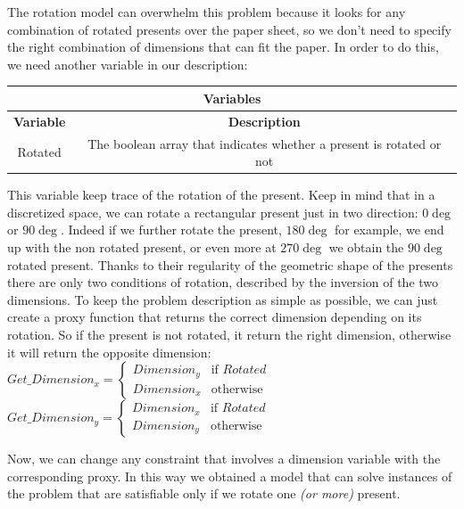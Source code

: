 The rotation model can overwhelm this problem because it looks for any combination of rotated presents over the paper sheet, so we don't need to specify the right combination
of dimensions that can fit the paper. In order to do this, we need another variable in our description:

\begin{center}
		\begin{tabular}{|c|c|}
			\hline
			\multicolumn{2}{|c|}{\textbf{Variables}} \\
			\hline
			\textbf{Variable} & {\textbf{Description}} \\
			\hline
			Rotated & The boolean array that indicates whether a present is rotated or not \\
			\hline
		\end{tabular}
\end{center}

This variable keep trace of the rotation of the present. Keep in mind that in a discretized space, we can rotate a rectangular present just in two direction: $0\deg$ or $90\deg$.
Indeed if we further rotate the present, $180\deg$ for example, we end up with the non rotated present, or even more at $270\deg$ we obtain the $90\deg$ rotated present.
Thanks to their regularity of the geometric shape of the presents there are only two conditions of rotation, described by the inversion of the two dimensions.
To keep the problem description as simple as possible, we can just create a proxy function that returns the correct dimension depending on its rotation.
So if the present is not rotated, it return the right dimension, otherwise it will return the opposite dimension:\\
$
Get\_Dimension_x = 
\begin{cases}
	Dimension_y & \text{if } Rotated \\
	Dimension_x & \text{otherwise}
\end{cases}
$
\\
$
Get\_Dimension_y = 
\begin{cases}
	Dimension_x & \text{if } Rotated \\
	Dimension_y & \text{otherwise}
\end{cases}
$

Now, we can change any constraint that involves a dimension variable with the corresponding proxy.
In this way we obtained a model that can solve instances of the problem that are satisfiable only if we rotate one \textit{(or more)} present.




